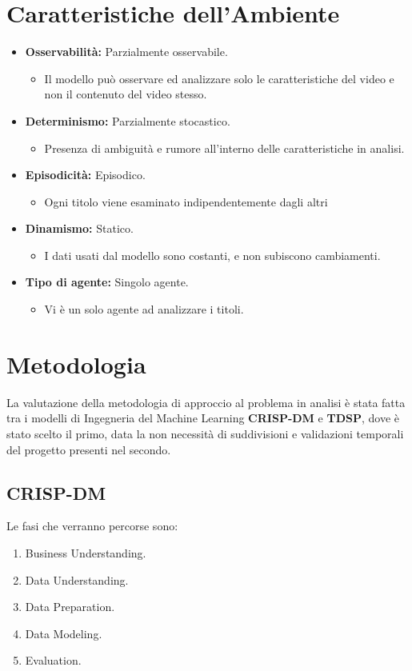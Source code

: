 \documentclass[a4paper,12pt]{report}
\begin{document}
\section{Caratteristiche dell'Ambiente}
\begin{itemize}
    \item \textbf{Osservabilità:} Parzialmente osservabile.
    \begin{itemize}
        \item Il modello può osservare ed analizzare solo le caratteristiche del video e non il contenuto del video stesso.
    \end{itemize}
    \item \textbf{Determinismo:} Parzialmente stocastico.
    \begin{itemize}
        \item Presenza di ambiguità e rumore all'interno delle caratteristiche in analisi.
    \end{itemize}
    \item \textbf{Episodicità:} Episodico.
    \begin{itemize}
        \item Ogni titolo viene esaminato indipendentemente dagli altri
    \end{itemize}
    \item \textbf{Dinamismo:} Statico.
    \begin{itemize}
        \item I dati usati dal modello sono costanti, e non subiscono cambiamenti.
    \end{itemize}
    \item \textbf{Tipo di agente:} Singolo agente.
    \begin{itemize}
        \item Vi è un solo agente ad analizzare i titoli.
    \end{itemize}
\end{itemize}

\newpage

\section{Metodologia}
La valutazione della metodologia di approccio al problema in analisi è stata fatta tra i modelli di Ingegneria del Machine Learning \textbf{CRISP-DM} e \textbf{TDSP}, dove è stato scelto il primo, data la non necessità di suddivisioni e validazioni temporali del progetto presenti nel secondo.

\subsection{CRISP-DM}
Le fasi che verranno percorse sono:
\begin{enumerate}
    \item Business Understanding.
    \item Data Understanding.
    \item Data Preparation.
    \item Data Modeling.
    \item Evaluation.
\end{enumerate}
\end{document}
